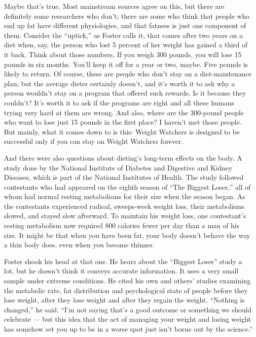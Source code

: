Maybe that's true. Most mainstream sources agree on this, but there are
definitely some researchers who don't; there are some who think that
people who end up fat have different physiologies, and that fatness is
just one component of them. Consider the ``uptick,'' as Foster calls it,
that comes after two years on a diet when, say, the person who lost 5
percent of her weight has gained a third of it back. Think about those
numbers. If you weigh 300 pounds, you will lose 15 pounds in six months.
You'll keep it off for a year or two, maybe. Five pounds is likely to
return. Of course, these are people who don't stay on a diet-maintenance
plan; but the average dieter certainly doesn't, and it's worth it to ask
why a person wouldn't stay on a program that offered such rewards. Is it
because they couldn't? It's worth it to ask if the programs are right
and all these humans trying very hard at them are wrong. And also, where
are the 300-pound people who want to lose just 15 pounds in the first
place? I haven't met those people. But mainly, what it comes down to is
this: Weight Watchers is designed to be successful only if you can stay
on Weight Watchers forever.

And there were also questions about dieting's long-term effects on the
body. A study done by the National Institute of Diabetes and Digestive
and Kidney Diseases, which is part of the National Institutes of Health.
The study followed contestants who had appeared on the eighth season of
``The Biggest Loser,'' all of whom had normal resting metabolisms for
their size when the season began. As the contestants experienced
radical, sweeps-week weight loss, their metabolisms slowed, and stayed
slow afterward. To maintain his weight loss, one contestant's resting
metabolism now required 800 calories fewer per day than a man of his
size. It might be that when you have been fat, your body doesn't behave
the way a thin body does, even when you become thinner.

Foster shook his head at that one. He hears about the ``Biggest Loser''
study a lot, but he doesn't think it conveys accurate information. It
uses a very small sample under extreme conditions. He cited his own and
others' studies examining the metabolic rate, fat distribution and
psychological state of people before they lose weight, after they lose
weight and after they regain the weight. ``Nothing is changed,'' he
said. ``I'm not saying that's a good outcome or something we should
celebrate --- but this idea that the act of managing your weight and
losing weight has somehow set you up to be in a worse spot just isn't
borne out by the science.''

